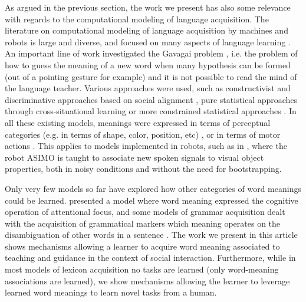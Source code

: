 As argued in the previous section, the work we present has also some relevance with regards to the computational modeling of language acquisition. The literature on computational modeling of language acquisition by machines and robots is large and diverse, and focused on many aspects of language learning \cite{steels2012grounding,steels2002aibos, cangelosi2010integration, kaplan2008computational, steels2003evolving, brent1997computational, yu2007unified}. An important line of work investigated the Gavagai problem \cite{quine1964word}, i.e. the problem of how to guess the meaning of a new word when many hypothesis can be formed (out of a pointing gesture for example) and it is not possible to read the mind of the language teacher. Various approaches were used, such as constructivist and discriminative approaches based on social alignment \cite{steels06spatialLanguage, steels2008can}, pure statistical approaches through cross-situational learning \cite{xu2007word, smith2008infants} or more constrained statistical approaches \cite{roy2005semiotic, yu2007unified}. In all these existing models, meanings were expressed in terms of perceptual categories (e.g. in terms of shape, color, position, etc) \cite{steels06spatialLanguage, steels2008can,yu2007unified}, or in terms of motor actions \cite{steels2008robot, Massera2010,sugita05a}. This applies to models implemented in robots, such as in \cite{heckmann2009teaching}, where  the robot ASIMO is taught to associate new spoken signals to visual object properties, both in noisy conditions and without the need for bootstrapping. 

Only very few models so far have explored how other categories of word meanings could be learned. \cite{cederborg2011imitating} presented a model where word meaning expressed the cognitive operation of attentional focus, and some models of grammar acquisition dealt with the acquisition of grammatical markers which meaning operates on the disambiguation of other words in a sentence \cite{steels2012fluid}. 
The work we present in this article shows mechanisms allowing a learner to acquire word meaning associated to teaching and guidance in the context of social interaction. Furthermore, while in most models of lexicon  acquisition no tasks are learned (only word-meaning associations are learned), we show mechanisms allowing the learner to leverage learned word meanings to learn novel tasks from a human.

